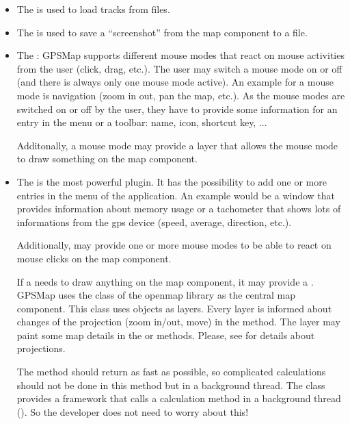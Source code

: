 \documentclass[a4paper]{article} %
\begin{document}
\begin{itemize}

\item The  is used to load tracks from
files.

\item The  is used to save a
``screenshot'' from the map component to a file.

\item The : GPSMap supports different
mouse modes that react on mouse activities from the user (click, drag,
etc.). The user may switch a mouse mode on or off (and there is always
only one mouse mode active). An example for a mouse mode is navigation
(zoom in out, pan the map, etc.). As the mouse modes are switched on
or off by the user, they have to provide some information for an entry
in the menu or a toolbar: name, icon, shortcut key, ...

Additonally, a mouse mode may provide a layer that allows the mouse
mode to draw something on the map component.
 
\item The  is the most powerful plugin. It
  has the possibility to add one or more entries in the menu of the
  application. An example would be a window that provides information
  about memory usage or a tachometer that shows lots of informations
  from the gps device (speed, average, direction, etc.).

Additionally,  may provide one or more mouse
modes to be able to react on mouse clicks on the map component. 

If a  needs to draw anything on the map
component, it may provide a .
GPSMap uses the  class of the openmap library as
the central map component. This class uses  objects
as layers.  Every layer is informed about changes of the projection
(zoom in/out, move) in the
method. The layer may paint some map details in the
 or
 methods. Please, see
 for details
about projections.

The  method should return as fast as possible, so
complicated calculations should not be done in this method but in a
background thread. The class
 provides a framework
that calls a calculation method in a background thread
(). So the developer does not need to worry
about this!


\end{itemize}
\end{document}
